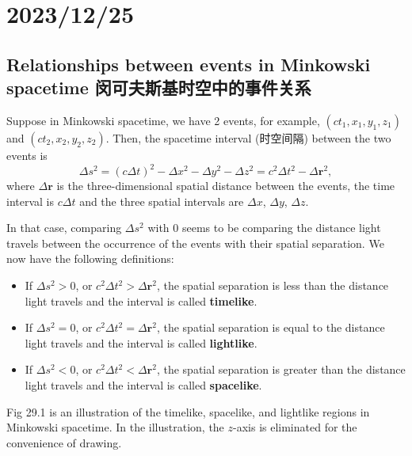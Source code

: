 \chapter{2023/12/25}\label{20231225}

\section{Relationships between events in Minkowski spacetime
闵可夫斯基时空中的事件关系}\label{relationships-between-events-in-minkowski-spacetime-ux95f5ux53efux592bux65afux57faux65f6ux7a7aux4e2dux7684ux4e8bux4ef6ux5173ux7cfb}

Suppose in Minkowski spacetime, we have 2 events, for example,
\((ct_1, x_1, y_1, z_1)\) and \((ct_2, x_2, y_2, z_2)\). Then, the
spacetime interval (时空间隔) between the two events is
\[\Delta s^2 = (c \Delta t)^2 - \Delta x^2 - \Delta y^2 - \Delta z^2 = c^2 \Delta t^2 - \Delta \boldsymbol{r}^2,\]
where \(\Delta \boldsymbol{r}\) is the three-dimensional spatial
distance between the events, the time interval is \(c\Delta t\) and the
three spatial intervals are \(\Delta x\), \(\Delta y\), \(\Delta z\).

In that case, comparing \(\Delta s^2\) with \(0\) seems to be comparing
the distance light travels between the occurrence of the events with
their spatial separation. We now have the following definitions:

\begin{itemize}
\tightlist{}
\item
  If \(\Delta s^2 > 0\), or
  \(c^2 \Delta t^2 > \Delta \boldsymbol{r}^2\), the spatial separation
  is less than the distance light travels and the interval is called
  \textbf{timelike}.
\item
  If \(\Delta s^2 = 0\), or
  \(c^2 \Delta t^2 = \Delta \boldsymbol{r}^2\), the spatial separation
  is equal to the distance light travels and the interval is called
  \textbf{lightlike}.
\item
  If \(\Delta s^2 < 0\), or
  \(c^2 \Delta t^2 < \Delta \boldsymbol{r}^2\), the spatial separation
  is greater than the distance light travels and the interval is called
  \textbf{spacelike}.
\end{itemize}

Fig 29.1 is an illustration of the timelike, spacelike, and lightlike
regions in Minkowski spacetime. In the illustration, the \(z\)-axis is
eliminated for the convenience of drawing.

